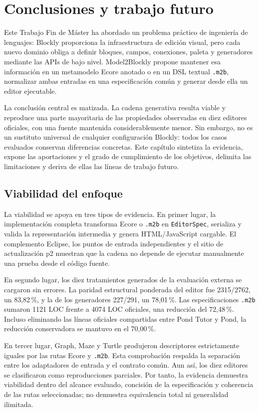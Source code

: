 \chapter{Conclusiones y trabajo futuro}
\label{chap:conclusiones}

Este Trabajo Fin de Máster ha abordado un problema práctico de ingeniería de
lenguajes: Blockly proporciona la infraestructura de edición visual, pero cada
nuevo dominio obliga a definir bloques, campos, conexiones, paleta y
generadores mediante las APIs de bajo nivel. Model2Blockly propone mantener esa
información en un metamodelo Ecore anotado o en un DSL textual \texttt{.m2b},
normalizar ambas entradas en una especificación común y generar desde ella un
editor ejecutable.

La conclusión central es matizada. La cadena generativa resulta viable y
reproduce una parte mayoritaria de las propiedades observadas en diez editores
oficiales, con una fuente mantenida considerablemente menor. Sin embargo, no es
un sustituto universal de cualquier configuración Blockly: todos los casos
evaluados conservan diferencias concretas. Este capítulo sintetiza la evidencia,
expone las aportaciones y el grado de cumplimiento de los objetivos, delimita
las limitaciones y deriva de ellas las líneas de trabajo futuro.

\section{Viabilidad del enfoque}
\label{sec:viabilidad-enfoque}

La viabilidad se apoya en tres tipos de evidencia. En primer lugar, la
implementación completa transforma Ecore o \texttt{.m2b} en
\texttt{EditorSpec}, serializa y valida la representación intermedia y
genera HTML/JavaScript cargable. El complemento Eclipse, los puntos de entrada
independientes y el sitio de actualización p2 muestran que la cadena no depende de ejecutar
manualmente una prueba desde el código fuente.

En segundo lugar, los diez tratamientos generados de la evaluación externa se
cargaron sin errores. La paridad estructural ponderada del editor fue
2315/2762, un 83,82\,\%, y la de los generadores 227/291, un 78,01\,\%. Las
especificaciones \texttt{.m2b} sumaron 1121 LOC frente a 4074 LOC oficiales, una
reducción del 72,48\,\%. Incluso eliminando las líneas oficiales compartidas
entre Pond Tutor y Pond, la reducción conservadora se mantuvo en el 70,00\,\%.

En tercer lugar, Graph, Maze y Turtle produjeron descriptores estrictamente
iguales por las rutas Ecore y \texttt{.m2b}. Esta comprobación respalda la
separación entre los adaptadores de entrada y el contrato común. Aun así, los
diez editores se clasificaron como reproducciones parciales. Por tanto, la
evidencia demuestra viabilidad dentro del alcance evaluado, concisión de la
especificación y coherencia de las rutas seleccionadas; no demuestra
equivalencia total ni generalidad ilimitada.


